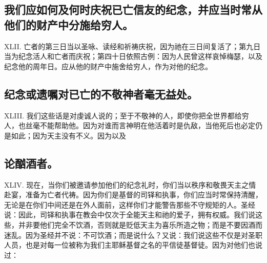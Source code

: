 
\subsection{我们应如何及何时庆祝已亡信友的纪念，并应当时常从他们的财产中分施给穷人。}

XLII. 亡者的第三日当以圣咏、读经和祈祷庆祝，因为祂在三日间复活了；第九日当为纪念活人和亡者而庆祝；第四十日依照古例：因为人民曾这样哀悼梅瑟，以及纪念他的周年日。应从他的财产中施舍给穷人，作为对他的纪念。\par


\subsection{纪念或遗嘱对已亡的不敬神者毫无益处。}

XLIII. 我们这些话是对虔诚人说的；至于不敬神的人，即使你把全世界都给穷人，也丝毫不能帮助他。因为对谁而言神明在他活着时是仇敌，当他死后也必定仍是如此；因为天主没有不义。因为以及\par


\subsection{论酗酒者。}

XLIV. 现在，当你们被邀请参加他们的纪念礼时，你们当以秩序和敬畏天主之情赴宴，准备为亡者代祷。因为你们是基督的司铎和执事，你们应当时常保持清醒，无论是在你们中间还是在外人面前，这样你们才能警告那些不守规矩的人。圣经说：因此，司铎和执事在教会中仅次于全能天主和祂的爱子，拥有权威。我们说这些，并非要他们完全不饮酒，否则就是贬低天主为喜乐所造之物；而是不要因酒而迷乱。因为圣经并不说：不可饮酒；而是说什么？又说：我们说这些不仅是对圣职人员，也是对每一位被称为我们主耶稣基督之名的平信徒基督徒。因为对他们也说过： \par

